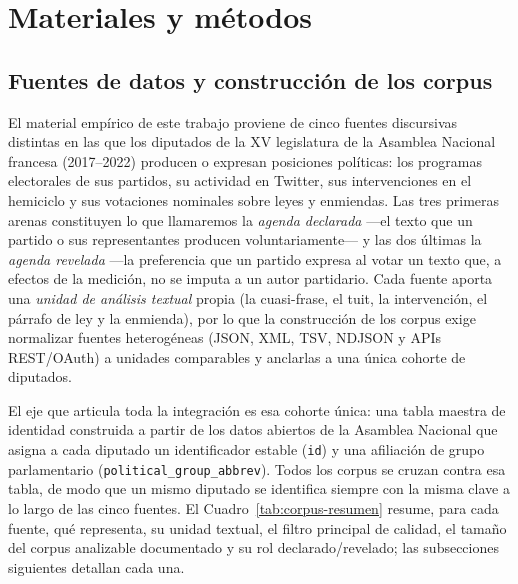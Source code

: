 \chapter{Materiales y métodos}
\label{cap:metodologia}


\section{Fuentes de datos y construcción de los corpus}
\label{sec:fuentes}

El material empírico de este trabajo proviene de cinco fuentes discursivas
distintas en las que los diputados de la XV legislatura de la Asamblea Nacional
francesa (2017--2022) producen o expresan posiciones políticas: los programas
electorales de sus partidos, su actividad en Twitter, sus intervenciones en el
hemiciclo y sus votaciones nominales sobre leyes y enmiendas. Las tres primeras
arenas constituyen lo que llamaremos la \emph{agenda declarada} ---el texto que
un partido o sus representantes producen voluntariamente--- y las dos últimas la
\emph{agenda revelada} ---la preferencia que un partido expresa al votar un
texto que, a efectos de la medición, no se imputa a un autor partidario. Cada
fuente aporta una \emph{unidad de análisis
textual} propia (la cuasi-frase, el tuit, la intervención, el párrafo de ley y
la enmienda), por lo que la construcción de los corpus exige normalizar fuentes
heterogéneas (JSON, XML, TSV, NDJSON y APIs REST/OAuth) a unidades comparables y
anclarlas a una única cohorte de diputados.

El eje que articula toda la integración es esa cohorte única: una tabla maestra
de identidad construida a partir de los datos abiertos de la Asamblea Nacional
que asigna a cada diputado un identificador estable (\texttt{id}) y una
afiliación de grupo parlamentario (\texttt{political\_group\_abbrev}). Todos los
corpus se cruzan contra esa tabla, de modo que un mismo diputado se identifica
siempre con la misma clave a lo largo de las cinco fuentes. El
Cuadro~\ref{tab:corpus-resumen} resume, para cada fuente, qué representa, su
unidad textual, el filtro principal de calidad, el tamaño del corpus analizable
documentado y su rol declarado/revelado; las subsecciones siguientes detallan
cada una.

